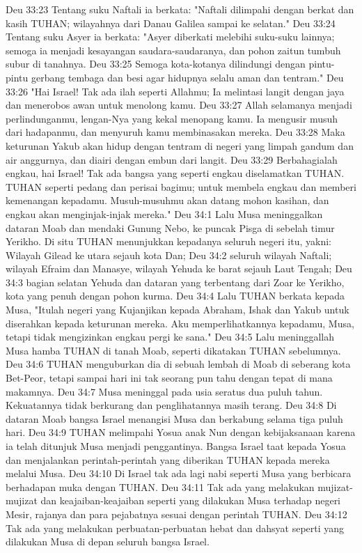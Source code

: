 Deu 33:23  Tentang suku Naftali ia berkata: "Naftali dilimpahi dengan berkat dan kasih TUHAN; wilayahnya dari Danau Galilea sampai ke selatan."
Deu 33:24  Tentang suku Asyer ia berkata: "Asyer diberkati melebihi suku-suku lainnya; semoga ia menjadi kesayangan saudara-saudaranya, dan pohon zaitun tumbuh subur di tanahnya.
Deu 33:25  Semoga kota-kotanya dilindungi dengan pintu-pintu gerbang tembaga dan besi agar hidupnya selalu aman dan tentram."
Deu 33:26  "Hai Israel! Tak ada ilah seperti Allahmu; Ia melintasi langit dengan jaya dan menerobos awan untuk menolong kamu.
Deu 33:27  Allah selamanya menjadi perlindunganmu, lengan-Nya yang kekal menopang kamu. Ia mengusir musuh dari hadapanmu, dan menyuruh kamu membinasakan mereka.
Deu 33:28  Maka keturunan Yakub akan hidup dengan tentram di negeri yang limpah gandum dan air anggurnya, dan diairi dengan embun dari langit.
Deu 33:29  Berbahagialah engkau, hai Israel! Tak ada bangsa yang seperti engkau diselamatkan TUHAN. TUHAN seperti pedang dan perisai bagimu; untuk membela engkau dan memberi kemenangan kepadamu. Musuh-musuhmu akan datang mohon kasihan, dan engkau akan menginjak-injak mereka."
Deu 34:1  Lalu Musa meninggalkan dataran Moab dan mendaki Gunung Nebo, ke puncak Pisga di sebelah timur Yerikho. Di situ TUHAN menunjukkan kepadanya seluruh negeri itu, yakni: Wilayah Gilead ke utara sejauh kota Dan;
Deu 34:2  seluruh wilayah Naftali; wilayah Efraim dan Manasye, wilayah Yehuda ke barat sejauh Laut Tengah;
Deu 34:3  bagian selatan Yehuda dan dataran yang terbentang dari Zoar ke Yerikho, kota yang penuh dengan pohon kurma.
Deu 34:4  Lalu TUHAN berkata kepada Musa, "Itulah negeri yang Kujanjikan kepada Abraham, Ishak dan Yakub untuk diserahkan kepada keturunan mereka. Aku memperlihatkannya kepadamu, Musa, tetapi tidak mengizinkan engkau pergi ke sana."
Deu 34:5  Lalu meninggallah Musa hamba TUHAN di tanah Moab, seperti dikatakan TUHAN sebelumnya.
Deu 34:6  TUHAN menguburkan dia di sebuah lembah di Moab di seberang kota Bet-Peor, tetapi sampai hari ini tak seorang pun tahu dengan tepat di mana makamnya.
Deu 34:7  Musa meninggal pada usia seratus dua puluh tahun. Kekuatannya tidak berkurang dan penglihatannya masih terang.
Deu 34:8  Di dataran Moab bangsa Israel menangisi Musa dan berkabung selama tiga puluh hari.
Deu 34:9  TUHAN melimpahi Yosua anak Nun dengan kebijaksanaan karena ia telah ditunjuk Musa menjadi penggantinya. Bangsa Israel taat kepada Yosua dan menjalankan perintah-perintah yang diberikan TUHAN kepada mereka melalui Musa.
Deu 34:10  Di Israel tak ada lagi nabi seperti Musa yang berbicara berhadapan muka dengan TUHAN.
Deu 34:11  Tak ada yang melakukan mujizat-mujizat dan keajaiban-keajaiban seperti yang dilakukan Musa terhadap negeri Mesir, rajanya dan para pejabatnya sesuai dengan perintah TUHAN.
Deu 34:12  Tak ada yang melakukan perbuatan-perbuatan hebat dan dahsyat seperti yang dilakukan Musa di depan seluruh bangsa Israel.


